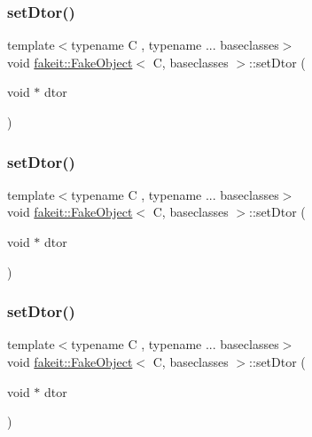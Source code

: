 \subsubsection{\texorpdfstring{setDtor()}{setDtor()}\hspace{0.1cm}{\footnotesize\ttfamily [3/9]}}
{\footnotesize\ttfamily template$<$typename C , typename ... baseclasses$>$ \\
void \mbox{\hyperlink{classfakeit_1_1FakeObject}{fakeit\+::\+Fake\+Object}}$<$ C, baseclasses $>$\+::set\+Dtor (\begin{DoxyParamCaption}\item[{void $\ast$}]{dtor }\end{DoxyParamCaption})\hspace{0.3cm}{\ttfamily [inline]}}

\mbox{\label{classfakeit_1_1FakeObject_a8045605042e0351da1e5d81288ae46ec}} 
\subsubsection{\texorpdfstring{setDtor()}{setDtor()}\hspace{0.1cm}{\footnotesize\ttfamily [4/9]}}
{\footnotesize\ttfamily template$<$typename C , typename ... baseclasses$>$ \\
void \mbox{\hyperlink{classfakeit_1_1FakeObject}{fakeit\+::\+Fake\+Object}}$<$ C, baseclasses $>$\+::set\+Dtor (\begin{DoxyParamCaption}\item[{void $\ast$}]{dtor }\end{DoxyParamCaption})\hspace{0.3cm}{\ttfamily [inline]}}

\mbox{\label{classfakeit_1_1FakeObject_a8045605042e0351da1e5d81288ae46ec}} 
\subsubsection{\texorpdfstring{setDtor()}{setDtor()}\hspace{0.1cm}{\footnotesize\ttfamily [5/9]}}
{\footnotesize\ttfamily template$<$typename C , typename ... baseclasses$>$ \\
void \mbox{\hyperlink{classfakeit_1_1FakeObject}{fakeit\+::\+Fake\+Object}}$<$ C, baseclasses $>$\+::set\+Dtor (\begin{DoxyParamCaption}\item[{void $\ast$}]{dtor }\end{DoxyParamCaption})\hspace{0.3cm}{\ttfamily [inline]}}

